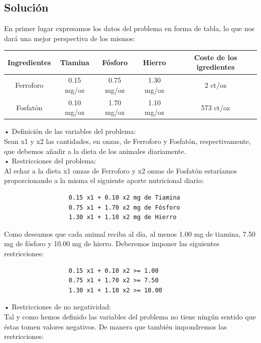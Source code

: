 \documentclass[a4,12pt]{article}
\begin{document}
\subsection{Solución}
En primer lugar expresamos los datos del problema en forma de tabla, lo que nos dará una mejor
perspectiva de los mismos:\\

\begin{center}
\begin{tabular}{|c|c|c|c|c|} \hline
\textbf{Ingredientes}   &  \textbf{Tiamina}  &  \textbf{Fósforo} &  \textbf{Hierro}  &  \textbf{Coste de los igredientes} \\ \hline
Ferroforo  & 0.15 mg/oz  &  0.75 mg/oz & 1.30 mg/oz  &  2 ct/oz  \\  \hline
Fosfatón  & 0.10 mg/oz  &  1.70 mg/oz & 1.10 mg/oz  &  573 ct/oz  \\  \hline
\end{tabular}
\end{center}

• Definición de las variables del problema:\\
Sean x1 y x2 las cantidades, en onzas, de Ferroforo y Fosfatón, respectivamente, que debemos añadir a la dieta de los animales diariamente.\\
• Restricciones del problema:\\
Al echar a la dieta x1 onzas de Ferroforo y x2 onzas de Fosfatón estaríamos proporcionando a la misma el siguiente aporte nutricional diario:\\

\begin{verbatim}
                  0.15 x1 + 0.10 x2 mg de Tiamina
                  0.75 x1 + 1.70 x2 mg de Fósforo
                  1.30 x1 + 1.10 x2 mg de Hierro
\end{verbatim}
                  
Como deseamos que cada animal reciba al día, al menos 1.00 mg de tiamina, 7.50 mg de fósforo y 10.00 mg de hierro. Deberemos imponer las siguientes restricciones:\\

\begin{verbatim}
                  0.15 x1 + 0.10 x2 >= 1.00
                  0.75 x1 + 1.70 x2 >= 7.50
                  1.30 x1 + 1.10 x2 >= 10.00
\end{verbatim}
                  
• Restricciones de no negatividad:\\
Tal y como hemos definido las variables del problema no tiene ningún sentido que éstas tomen valores negativos. De manera que también impondremos las restricciones:\\
\end{document}
